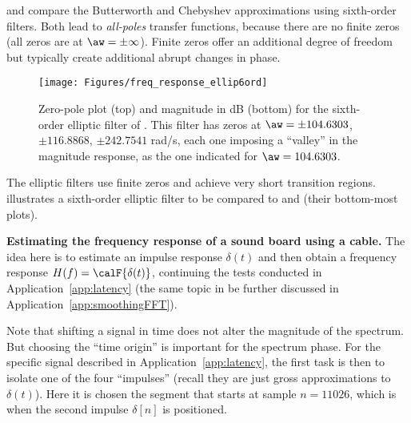  and  compare the Butterworth and Chebyshev approximations using sixth-order filters. Both lead to \emph{all-poles} transfer functions, because there are no finite zeros (all zeros are at $\aw = \pm \infty$). Finite zeros offer an additional degree of freedom but typically create additional abrupt changes in phase.

\begin{figure}
\centering
\texttt{[image: Figures/freq\_response\_ellip6ord]}
\caption[{Zero-pole plot (top) and magnitude in dB (bottom) for the sixth-order elliptic filter of .}]{Zero-pole plot (top) and magnitude in dB (bottom) for the sixth-order elliptic filter of .
This filter has zeros at $\aw = \pm 104.6303$, $\pm 116.8868$, $\pm 242.7541$ rad/s, each one imposing a ``valley'' in the magnitude response, as the one indicated for $\aw = 104.6303$.\label{fig:freq_response_ellip6ord}}
\end{figure}

The elliptic filters use finite zeros and achieve very short transition regions.  illustrates a sixth-order elliptic filter to be compared to  and  (their bottom-most plots).
\eApplication 



\bApplication \textbf{Estimating the frequency response of a sound board using a cable.}
The idea here is to estimate an impulse response $\delta(t)$ and then obtain a frequency response $H(f) = \calF \{\delta(t)\}$, continuing the tests conducted in Application~\ref{app:latency} (the same topic in be further discussed in Application~\ref{app:smoothingFFT}). 

Note that 
shifting a signal in time does not alter the magnitude of the spectrum. But choosing the ``time origin'' is important 
for the spectrum phase. 
For the specific signal described in Application~\ref{app:latency}, 
the first task is then to isolate one of the four ``impulses'' (recall they are just gross approximations to $\delta(t)$). Here it is chosen the segment that starts at sample $n=11026$, which is when the second impulse $\delta[n]$ is positioned.

